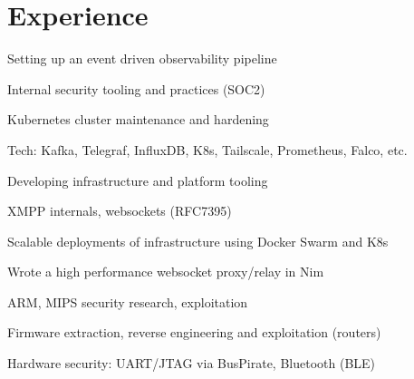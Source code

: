 \documentclass[]{config}
\begin{document}
\begin{minipage}[t]{0.66\textwidth} 


\section{Experience}

\vspace{\topsep} %
\begin{tightemize}
\item Setting up an event driven observability pipeline
\item Internal security tooling and practices (SOC2)
\item Kubernetes cluster maintenance and hardening
\item Tech: Kafka, Telegraf, InfluxDB, K8s, Tailscale, Prometheus, Falco, etc.
\end{tightemize}
\sectionsep


\vspace{\topsep} %
\begin{tightemize}
\item Developing infrastructure and platform tooling
\item XMPP internals, websockets (RFC7395)
\item Scalable deployments of infrastructure using Docker Swarm and K8s
\item Wrote a high performance websocket proxy/relay in Nim
\end{tightemize}
\sectionsep

\begin{tightemize}
\item ARM, MIPS security research, exploitation
\item Firmware extraction, reverse engineering and exploitation (routers)
\item Hardware security: UART/JTAG via BusPirate, Bluetooth (BLE)
\end{tightemize}
\sectionsep


\end{minipage}
\end{document}
